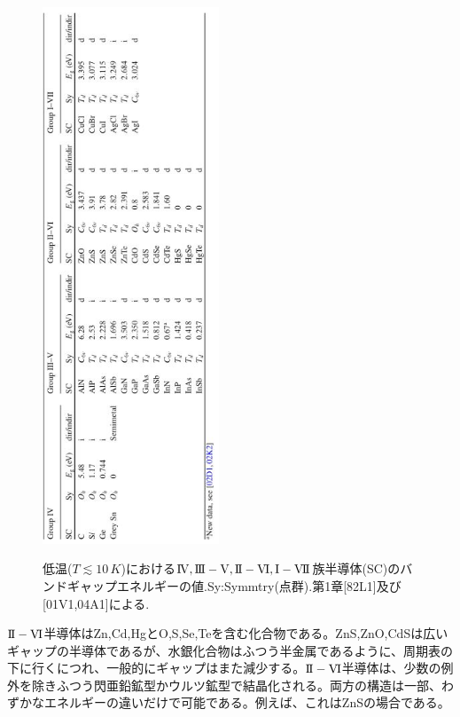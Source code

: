 \documentclass[11pt,a4j,uplatex]{jsarticle}
\begin{document}
\renewcommand{\figurename}{表}%
\setcounter{figure}{1}
\begin{figure}[htb]
  \centering
  \caption{低温($T\lesssim10\,K$)における$\mathrm{I\hspace{-1pt}V},\mathrm{I\hspace{-1pt}I\hspace{-1pt}I-V},\mathrm{I\hspace{-1pt}I-V\hspace{-1pt}I},\mathrm{I-V\hspace{-1pt}I\hspace{-1pt}I}$族半導体(SC)のバンドギャップエネルギーの値.Sy:Symmtry(点群).第1章[82L1]及び[01V1,04A1]による.}
  \includegraphics[clip,height=16cm]{8_2.JPG}
  \label{table8.2}

\end{figure}
$\mathrm{I\hspace{-1pt}I-V\hspace{-1pt}I}$半導体はZn,Cd,HgとO,S,Se,Teを含む化合物である。ZnS,ZnO,CdSは広いギャップの半導体であるが、水銀化合物はふつう半金属であるように、周期表の下に行くにつれ、一般的にギャップはまた減少する。$\mathrm{I\hspace{-1pt}I-V\hspace{-1pt}I}$半導体は、少数の例外を除きふつう閃亜鉛鉱型かウルツ鉱型で結晶化される。両方の構造は一部、わずかなエネルギーの違いだけで可能である。例えば、これはZnSの場合である。
\end{document}
